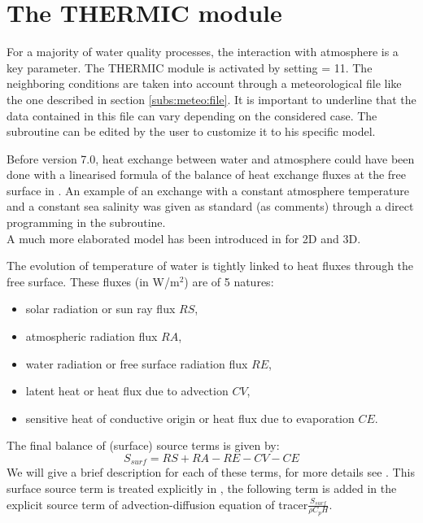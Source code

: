\chapter{The THERMIC module}
\label{subs:therm:mod}
For a majority of water quality processes, the interaction with atmosphere is a key parameter.
The THERMIC module is activated by setting  = 11.
The neighboring conditions are taken into account through a meteorological file
like the one described in section \ref{subs:meteo:file}.
It is important to underline that the data contained in this file
can vary depending on the considered case.
The subroutine  can be edited by the user to customize it to his specific model.

Before version 7.0, heat exchange between water and atmosphere could have been
done with a linearised formula of the balance of heat exchange fluxes at the
free surface in . An example of an exchange with a constant atmosphere temperature
and a constant sea salinity was given as standard (as comments) through a
direct programming in the  subroutine.\\

A much more elaborated model has been introduced in \waqtel for 2D and 3D.

The evolution of temperature of water is tightly linked to heat fluxes through the free surface.
These fluxes (in W/m$^2$) are of 5 natures:

\begin{itemize}
\item solar radiation or sun ray flux $RS$,
\item atmospheric radiation flux $RA$,
\item water radiation or free surface radiation flux $RE$,
\item latent heat or heat flux due to advection $CV$,
\item sensitive heat of conductive origin or heat flux due to evaporation $CE$.
\end{itemize}

The final balance of (surface) source terms is given by:
\[S_{surf}=RS+RA-RE-CV-CE\]
We will give a brief description for each of these terms, for more details see \cite{El-Kadi2012}.
This surface source term is treated explicitly in ,
the following term is added in the explicit source term of advection-diffusion equation
of tracer$\frac{S_{surf}}{\rho C_pH}$.\\

